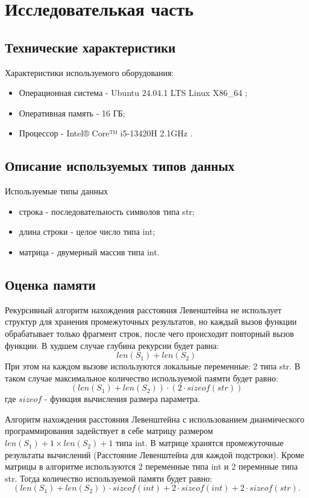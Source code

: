 \chapter{Исследователькая часть}
\section{Технические характеристики}
Характеристики используемого оборудования:
\begin{itemize}
\item Операционная система - Ubuntu 24.04.1 LTS \cite{ubuntu} Linux X86\_64 \cite{linux};
\item Оперативная память - 16 ГБ;
\item Процессор - Intel® Core™ i5-13420H 2.1GHz \cite{intel}.
\end{itemize}
\section{Описание используемых типов данных}
Используемые типы данных
\begin{itemize}
\item строка - последовательность символов типа str;
\item длина строки - целое число типа int;
\item матрица - двумерный массив типа int.
\end{itemize}
\section{Оценка памяти}
Рекурсивный алгоритм нахождения расстояния Левенштейна не использует структур для хранения промежуточных результатов, но каждый вызов функции обрабатывает только фрагмент строк, после чего происходит повторный вызов функции. В худшем случае глубина рекурсии будет равна:
\begin{equation}
len(S_1) + len(S_2)
\end{equation} 
При этом на каждом вызове используются локальные переменные: 2 типа str. В таком случае максимальное количество используемой паямти будет равно:
\begin{equation}
(len(S_1) + len(S_2)) \cdot (2 \cdot sizeof(str)) 
\end{equation}
где $sizeof$ - функция вычисления размера параметра.

Алгоритм нахождения расстояния Левенштейна с использованием дианмического программирования задействует в себе матрицу размером $len(S_1) + 1 \times len(S_2) + 1$ типа int. В матрице хранятся промежуточные результаты вычислений (Расстояние Левенштейна для каждой подстроки). Кроме матрицы в алгоритме используются 2 переменные типа int и 2 перемнные типа str. Тогда количество используемой памяти будет равно:
\begin{equation}
(len(S_1) + len(S_2)) \cdot sizeof(int) + 2 \cdot sizeof(int) + 2 \cdot sizeof(str).
\end{equation}

